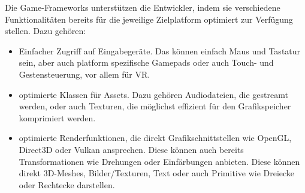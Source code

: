 Die Game-Frameworks unterstützen die Entwickler, indem sie verschiedene Funktionalitäten bereits für die jeweilige Zielplatform optimiert zur Verfügung stellen. Dazu gehören:

\begin{itemize}
\item Einfacher Zugriff auf Eingabegeräte. Das können einfach Maus und Tastatur sein, aber auch platform spezifische Gamepads oder auch Touch- und Gestensteuerung, vor allem für VR.\\
\item optimierte Klassen für Assets. Dazu gehören Audiodateien, die gestreamt werden, oder auch Texturen, die möglichst effizient für den Grafikspeicher komprimiert werden.\\
\item optimierte Renderfunktionen, die direkt Grafikschnittstellen wie OpenGL, Direct3D oder Vulkan ansprechen. Diese können auch bereits Transformationen wie Drehungen oder Einfärbungen anbieten. Diese können direkt 3D-Meshes, Bilder/Texturen, Text oder auch Primitive wie Dreiecke oder Rechtecke darstellen.\\
\end{itemize}

